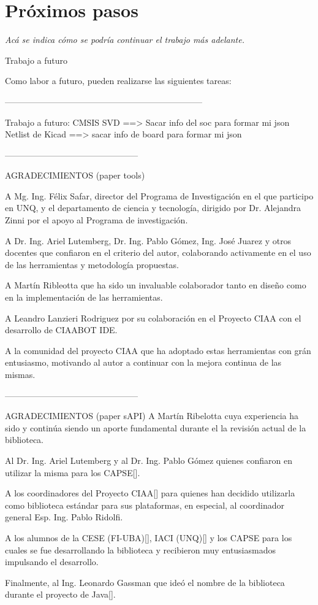 \section{Próximos pasos}

\emph{Acá se indica cómo se podría continuar el trabajo más adelante.}

Trabajo a futuro

Como labor a futuro, pueden realizarse las siguientes tareas:

---------------------------------------------------------------------

Trabajo a futuro:
CMSIS SVD ==> Sacar info del soc para formar mi json
Netlist de Kicad ==> sacar info de board para formar mi json

-----------------------------------------------

AGRADECIMIENTOS (paper tools)

A Mg. Ing. Félix Safar, director del Programa de
Investigación en el que participo en UNQ, y el departamento
de ciencia y tecnología, dirigido por Dr. Alejandra Zinni por el
apoyo al Programa de investigación.

A Dr. Ing. Ariel Lutemberg, Dr. Ing. Pablo Gómez, Ing.
José Juarez y otros docentes que confiaron en el criterio del
autor, colaborando activamente en el uso de las herramientas y
metodología propuestas.

A Martín Ribleotta que ha sido un invaluable colaborador
tanto en diseño como en la implementación de las
herramientas.

A Leandro Lanzieri Rodriguez por su colaboración en el
Proyecto CIAA con el desarrollo de CIAABOT IDE.

A la comunidad del proyecto CIAA que ha adoptado estas
herramientas con grán entusiasmo, motivando al autor a
continuar con la mejora continua de las mismas.

-----------------------------------------------

AGRADECIMIENTOS  (paper sAPI)
A Martín Ribelotta cuya experiencia ha sido y continúa siendo un aporte fundamental durante el la revisión actual de la biblioteca.

Al Dr. Ing. Ariel Lutemberg y al Dr. Ing. Pablo Gómez quienes confiaron en utilizar la misma para los CAPSE[].

A los coordinadores del Proyecto CIAA[] para quienes han decidido utilizarla como biblioteca estándar para sus plataformas, en especial, al coordinador general Esp. Ing. Pablo Ridolfi.

A los alumnos de la CESE (FI-UBA)[], IACI (UNQ)[] y los CAPSE para los cuales se fue desarrollando la biblioteca y recibieron muy entusiasmados impulsando el desarrollo.

Finalmente, al Ing. Leonardo Gassman que ideó el nombre de la biblioteca durante el proyecto de Java[].



